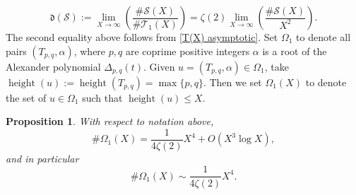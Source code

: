 \documentclass[table]{amsart}
\newtheorem{proposition}[theorem]{Proposition}
\newcommand{\op}[1]{\operatorname{#1}}
\numberwithin{equation}{section}
\begin{document}
\[\mathfrak{d}(\mathcal{S}):=\lim_{X\rightarrow \infty} \left(\frac{\# \mathcal{S}(X)}{ \#\mathcal{T}_1(X)}\right)=\zeta(2)\lim_{X\rightarrow \infty} \left(\frac{\# \mathcal{S}(X)}{ X^2}\right).\] The second equality above follows from \eqref{T(X) asymptotic}. Set $\Omega_1$ to denote all pairs $(T_{p,q}, \alpha)$, where $p,q$ are coprime positive integers $\alpha$ is a root of the Alexander polynomial $\Delta_{p, q}(t)$. Given $u=(T_{p,q}, \alpha)\in \Omega_1$, take $\op{height}(u):=\op{height}(T_{p,q})=\op{max}\{p, q\}$. Then we set $\Omega_1(X)$ to denote the set of $u\in \Omega_1$ such that $\op{height}(u)\leq X$. 
\begin{proposition}
    With respect to notation above, 
\[
\#\Omega_1(X)=\frac{1}{4 \zeta(2)} X^4 + O(X^3\log X),
\]
and in particular
\[
\#\Omega_1(X)\sim \frac{1}{4 \zeta(2)}X^4 .
\]
\end{proposition}
\end{document}
